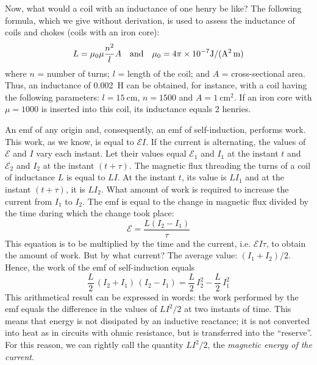 Now, what would a coil with an inductance of one henry be like? The following formula, which we give without derivation, is used to assess the inductance of coils and chokes (coils with an iron core):
\begin{equation*}%
L= \mu_{0}\mu \frac{n^{2}}{l}A \qq{and} \mu_{0} = 4\pi \times \num{d-7} \si{\joule\per\ampere\squared\per\meter}
\end{equation*}
where $n$ = number of turns; $l$ = length of the coil; and $A$ = cross-sectional area. Thus, an inductance of \SI{0.002}{\henry} can be obtained, for instance, with a coil having the following parameters: $l = \SI{15}{\centi\meter}$, $n = 1500$ and $A = \SI{1}{\centi\meter\squared}$. If an iron core with $\mu = 1000$ is inserted into this coil, its inductance equals 2 henries.

An emf of any origin and, consequently, an emf of self-induction, performs work. This work, as we know, is equal to $\mathcal{E}I$. If the current is alternating, the values of $\mathcal{E}$ and $I$ vary each instant. Let their values equal $\mathcal{E}_{1}$ and $I_{1}$ at the instant $t$ and $\mathcal{E}_{2}$ and $I_{2}$ at the instant $(t+ \tau)$. The magnetic flux threading the turns of a coil of inductance $L$ is equal to $LI$. At the instant $t$, its value
is $LI_{1}$ and at the instant $(t+\tau)$, it is $LI_{2}$. What amount of work is required to increase the current from $I_{1}$ to $I_{2}$. The emf is equal to the change in magnetic flux divided by the time during which the change took place:
\begin{equation*}%
\mathcal{E} = \frac{L(I_{2} - I_{1})}{\tau}
\end{equation*}
This equation is to be multiplied by the time and the current, i.e. $\mathcal{E}I\tau$, to obtain the amount of work. But by what current? The average value: $(I_{1}+I_{2})/2$. Hence, the work of the emf of self-induction equals 
\begin{equation*}%
\frac{L}{2}\, (I_{2}+I_{1})\, (I_{2} - I_{1}) = \frac{L}{2} \,I_{2}^{2} - \frac{L}{2} \,I_{1}^{2}
\end{equation*}
This arithmetical result can be expressed in words: the work performed by the emf equals the difference in the values of $LI^{2}/2$ at two instants of time. This means that energy is not dissipated by an inductive reactance; it is not converted into heat as in circuits with ohmic resistance, but is transferred into the ``reserve''. For this reason, we can rightly call the quantity $LI^{2}/2$, the \emph{magnetic energy of the current}.

